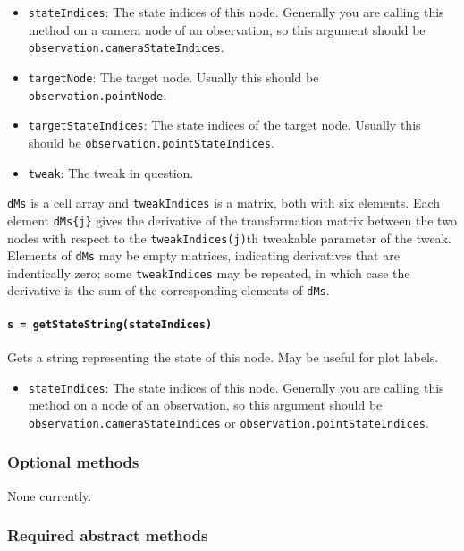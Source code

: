 \begin{itemize}
    \item \texttt{stateIndices}: The state indices of this node. 
        Generally you are calling this method on a camera node of an observation, so this argument should be \texttt{observation.cameraStateIndices}.
    \item \texttt{targetNode}: The target node. Usually this should be \texttt{observation.pointNode}.
    \item \texttt{targetStateIndices}: The state indices of the target node. Usually this should be \texttt{observation.pointStateIndices}.
    \item \texttt{tweak}: The tweak in question.
\end{itemize}

\texttt{dMs} is a cell array and \texttt{tweakIndices} is a matrix, both with six elements. Each element \texttt{dMs\{j\}} gives the derivative of the 
transformation matrix between the two nodes with respect to the \texttt{tweakIndices(j)}th tweakable parameter of the tweak.
Elements of \texttt{dMs} may be empty matrices, indicating derivatives that are indentically zero; some \texttt{tweakIndices} may be
repeated, in which case the derivative is the sum of the corresponding elements of \texttt{dMs}.

\paragraph{\texttt{s = getStateString(stateIndices)}}

Gets a string representing the state of this node. May be useful for plot labels.
\begin{itemize}
    \item \texttt{stateIndices}: The state indices of this node. 
        Generally you are calling this method on a node of an observation, so this argument should be \texttt{observation.cameraStateIndices}
        or \texttt{observation.pointStateIndices}.
\end{itemize}

\subsubsection{Optional methods}
None currently.

\subsubsection{Required abstract methods}

